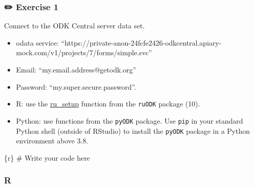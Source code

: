 \documentclass[
  letterpaper,
  DIV=11,
  numbers=noendperiod,
  oneside]{scrreprt}
\newenvironment{Shaded}{\begin{snugshade}}{\end{snugshade}}
\newcommand{\CommentTok}[1]{\textcolor[rgb]{0.37,0.37,0.37}{#1}}
\newcommand{\InformationTok}[1]{\textcolor[rgb]{0.37,0.37,0.37}{#1}}
\providecommand{\tightlist}{%
  \setlength{\itemsep}{0pt}\setlength{\parskip}{0pt}}\usepackage{longtable,booktabs,array}
\begin{document}
\hypertarget{exercise-1-7}{%
\subsubsection{\texorpdfstring{{✏️} Exercise
1}{✏️ Exercise 1}}\label{exercise-1-7}}

Connect to the ODK Central server data set.

\begin{itemize}
\tightlist
\item
  odata service:
  ``https://private-anon-24fcfe2426-odkcentral.apiary-mock.com/v1/projects/7/forms/simple.svc''
\item
  Email: ``my.email.address@getodk.org''
\item
  Password: ``my.super.secure.password''.
\end{itemize}

\begin{tcolorbox}[enhanced jigsaw, colbacktitle=quarto-callout-tip-color!10!white, titlerule=0mm, breakable, opacityback=0, opacitybacktitle=0.6, left=2mm, coltitle=black, colback=white, title=\textcolor{quarto-callout-tip-color}{\faLightbulb}\hspace{0.5em}{Tip}, rightrule=.15mm, colframe=quarto-callout-tip-color-frame, toprule=.15mm, bottomtitle=1mm, toptitle=1mm, arc=.35mm, bottomrule=.15mm, leftrule=.75mm]

\begin{itemize}
\tightlist
\item
  R: use the
  \href{https://docs.ropensci.org/ruODK/reference/ru_setup.html}{ru\_setup}
  function from the \texttt{ruODK} package (10).
\item
  Python: use functions from the \texttt{pyODK} package. Use
  \texttt{pip} in your standard Python shell (outside of RStudio) to
  install the \texttt{pyODK} package in a Python environment above 3.8.
\end{itemize}

\end{tcolorbox}

\begin{Shaded}
\begin{Highlighting}[]
\InformationTok{\textasciigrave{}\textasciigrave{}\textasciigrave{}\{r\}}
\CommentTok{\# Write your code here}
\InformationTok{\textasciigrave{}\textasciigrave{}\textasciigrave{}}
\end{Highlighting}
\end{Shaded}

\hypertarget{r-17}{%
\subsubsection{R}\label{r-17}}
\end{document}
